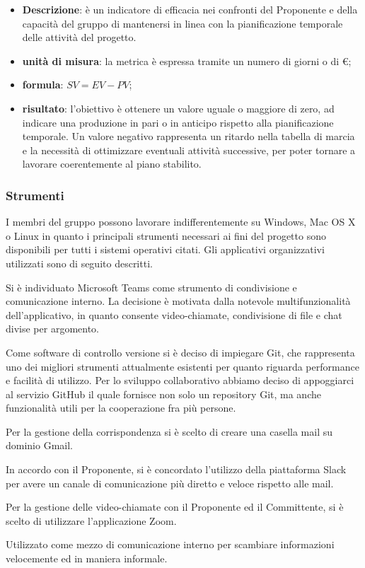 		\begin{itemize}
			\item \textbf{Descrizione}: è un indicatore di efficacia nei confronti del Proponente e della capacità del gruppo di mantenersi in linea con la pianificazione temporale delle attività del progetto.
			\item \textbf{unità di misura}: la metrica è espressa tramite un numero di giorni o di \euro;
			\item \textbf{formula}: $SV = EV - PV$;
			\item \textbf{risultato}: l'obiettivo è ottenere un valore uguale o maggiore di zero, ad indicare una produzione in pari o in anticipo rispetto alla pianificazione temporale. Un valore negativo rappresenta un ritardo nella tabella di marcia e la necessità di ottimizzare eventuali attività successive, per poter tornare a lavorare coerentemente al piano stabilito.
		\end{itemize}
		\subsubsection{Strumenti}
			I membri del gruppo \Gruppo{} possono lavorare indifferentemente su Windows, Mac OS X o Linux in quanto i principali strumenti necessari ai fini del progetto sono disponibili per tutti i sistemi operativi citati. Gli applicativi organizzativi utilizzati sono di seguito descritti.
			
				Si è individuato Microsoft Teams come strumento di condivisione e comunicazione interno. La decisione è motivata dalla notevole multifunzionalità dell'applicativo, in quanto consente video-chiamate, condivisione di file e chat divise per argomento.
				
				Come software di controllo versione si è deciso di impiegare Git, che rappresenta uno dei migliori strumenti attualmente esistenti per quanto riguarda performance e facilità di utilizzo. Per lo sviluppo collaborativo abbiamo deciso di appoggiarci al servizio GitHub il quale fornisce non solo un repository\ped{\textit{G}} Git, ma anche funzionalità utili per la cooperazione fra più persone.
							
				Per la gestione della corrispondenza si è scelto di creare una casella mail su dominio Gmail.
				
				In accordo con il Proponente, si è concordato l'utilizzo della piattaforma Slack per avere un canale di comunicazione più diretto e veloce rispetto alle mail.
			
				Per la gestione delle video-chiamate con il Proponente ed il Committente, si è scelto di utilizzare l'applicazione Zoom.
				
				Utilizzato come mezzo di comunicazione interno per scambiare informazioni velocemente ed in maniera informale.
	